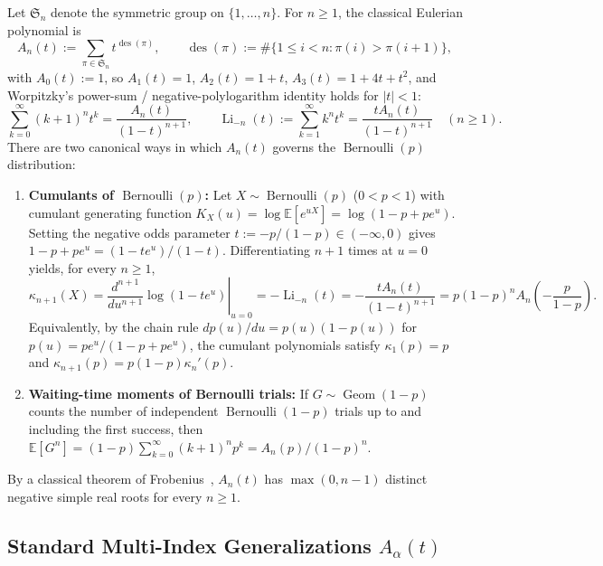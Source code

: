 \documentclass[11pt]{article}
\theoremstyle{definition}
\newcommand{\des}{\operatorname{des}}
\newcommand{\Li}{\operatorname{Li}}
\newcommand{\Bern}{\operatorname{Bernoulli}}
\newcommand{\Geom}{\operatorname{Geom}}
\begin{document}
Let $\mathfrak{S}_n$ denote the symmetric group on $\{1,\dots,n\}$. For $n \ge 1$, the
classical Eulerian polynomial is
\begin{equation}\label{eq:classical-eulerian}
  A_n(t) := \sum_{\pi \in \mathfrak{S}_n} t^{\des(\pi)}, \qquad
  \des(\pi) := \#\{1 \le i < n : \pi(i) > \pi(i+1)\},
\end{equation}
with $A_0(t) := 1$, so $A_1(t)=1$, $A_2(t)=1+t$, $A_3(t)=1+4t+t^2$, and Worpitzky's
power-sum / negative-polylogarithm identity holds for $|t| < 1$:
\begin{equation}\label{eq:worpitzky}
  \sum_{k=0}^{\infty} (k+1)^n t^k = \frac{A_n(t)}{(1-t)^{n+1}}, \qquad
  \Li_{-n}(t) := \sum_{k=1}^{\infty} k^n t^k = \frac{t A_n(t)}{(1-t)^{n+1}} \quad (n \ge 1).
\end{equation}
There are two canonical ways in which $A_n(t)$ governs the $\Bern(p)$ distribution:
\begin{enumerate}
  \item \textbf{Cumulants of $\Bern(p)$:} Let $X \sim \Bern(p)$ ($0 < p < 1$) with cumulant
  generating function $K_X(u) = \log \mathbb{E}[e^{uX}] = \log(1 - p + p e^u)$. Setting the
  negative odds parameter $t := -p/(1-p) \in (-\infty,0)$ gives $1 - p + p e^u =
  (1 - t e^u)/(1 - t)$. Differentiating $n+1$ times at $u = 0$ yields, for every $n \ge 1$,
  \begin{equation}\label{eq:bernoulli-cumulant}
    \kappa_{n+1}(X) = \left.\frac{d^{n+1}}{du^{n+1}} \log(1 - t e^u)\right|_{u=0}
    = -\Li_{-n}(t) = -\frac{t A_n(t)}{(1-t)^{n+1}}
    = p(1-p)^n A_n\!\left(-\frac{p}{1-p}\right).
  \end{equation}
  Equivalently, by the chain rule $dp(u)/du = p(u)(1-p(u))$ for $p(u) = pe^u/(1-p+pe^u)$,
  the cumulant polynomials satisfy $\kappa_1(p) = p$ and $\kappa_{n+1}(p) = p(1-p)\kappa_n'(p)$.
  \item \textbf{Waiting-time moments of Bernoulli trials:} If $G \sim \Geom(1-p)$ counts the
  number of independent $\Bern(1-p)$ trials up to and including the first success, then
  $\mathbb{E}[G^n] = (1-p)\sum_{k=0}^\infty (k+1)^n p^k = A_n(p)/(1-p)^n$.
\end{enumerate}
By a classical theorem of Frobenius~\cite{Frobenius1910}, $A_n(t)$ has $\max(0,n-1)$
distinct negative simple real roots for every $n \ge 1$.

\subsection{Standard Multi-Index Generalizations \texorpdfstring{$A_\alpha(t)$}{A\_alpha(t)}}
\end{document}
